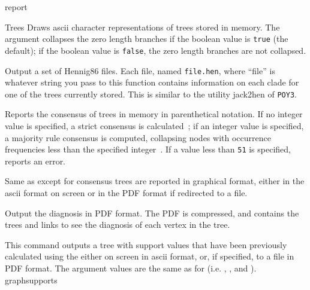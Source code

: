 \begin{command}{report}{}
\begin{arguments}
\begin{argumentgroup}{Trees}
                {Draws ascii character representations of trees stored in memory. The
                argument  collapses the zero length branches if
                the boolean value is \texttt{true} (the default); if the boolean value is
                \texttt{false}, the zero length branches are not collapsed.}
				{}

	       {Output a set of Hennig86 files. Each file, named \texttt{file.hen},
                where ``file'' is whatever string you pass to this function
                contains information on each clade for one of the trees
                currently stored. This is similar to the utility jack2hen 
                of \texttt{POY3}.}
				{}

                {Reports the consensus of trees in memory in parenthetical notation.
                If no integer value is
                specified, a strict consensus is calculated~\cite{rohlf1982};
                if an integer value is specified,
                a majority rule consensus is computed, collapsing nodes with
                occurrence frequencies less than the specified integer~\cite{margush1981}.
                If a value less
                than \texttt{51} is specified, \poy reports an error.} 
                {}

                {Same as  except for consensus trees are
                reported in graphical format, either in the ascii format on
                screen or in the PDF format if redirected to a file.}
                {}

                {Output the diagnosis in PDF format. The PDF is compressed, and
                contains the trees and links to see the diagnosis of each vertex
                in the tree.}
                {}

                {This command outputs a tree with support values that have
                been previously calculated using the
                 either on screen
                in ascii format, or, if specified, to a file in PDF
                format. The argument values are the same as for 
                 (i.e. ,
                , and ).} 
                {graphsupports}


\end{argumentgroup}
\end{arguments}
\end{command}
